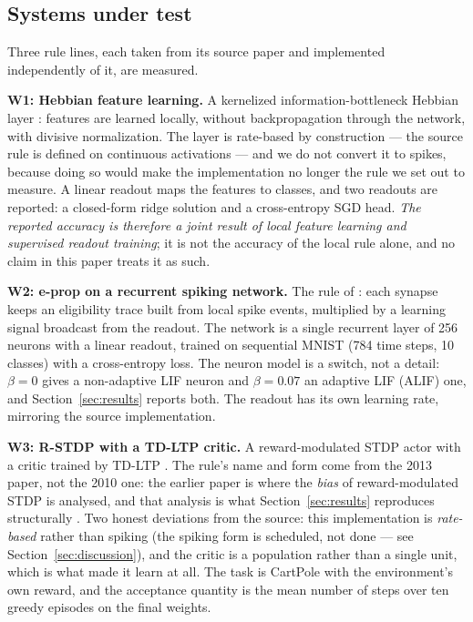 \documentclass[11pt]{article}
\begin{document}
\subsection{Systems under test}
Three rule lines, each taken from its source paper and implemented independently
of it, are measured.

\textbf{W1: Hebbian feature learning.} A kernelized information-bottleneck
Hebbian layer \citep{pogodin2020kernelized}: features are learned locally,
without backpropagation through the network, with divisive normalization. The
layer is rate-based by construction --- the source rule is defined on continuous
activations --- and we do not convert it to spikes, because doing so would make
the implementation no longer the rule we set out to measure. A linear readout
maps the features to classes, and two readouts are reported: a closed-form ridge
solution and a cross-entropy SGD head. \emph{The reported accuracy is therefore a
joint result of local feature learning and supervised readout training}; it is
not the accuracy of the local rule alone, and no claim in this paper treats it
as such.

\textbf{W2: e-prop on a recurrent spiking network.} The rule of
\citet{bellec2020eprop}: each synapse keeps an eligibility trace built from
local spike events, multiplied by a learning signal broadcast from the readout.
The network is a single recurrent layer of 256 neurons with a linear readout,
trained on sequential MNIST (784 time steps, 10 classes) with a cross-entropy
loss. The neuron model is a switch, not a detail: $\beta = 0$ gives a
non-adaptive LIF neuron and $\beta = 0.07$ an adaptive LIF (ALIF) one, and
Section~\ref{sec:results} reports both. The readout has its own learning rate,
mirroring the source implementation.

\textbf{W3: R-STDP with a TD-LTP critic.} A reward-modulated STDP actor with a
critic trained by TD-LTP \citep{fremaux2013}. The rule's name and form come from
the 2013 paper, not the 2010 one: the earlier paper is where the \emph{bias} of
reward-modulated STDP is analysed, and that analysis is what Section~\ref{sec:results}
reproduces structurally \citep{fremaux2010}. Two honest deviations
from the source: this implementation is \emph{rate-based} rather than spiking
(the spiking form is scheduled, not done --- see Section~\ref{sec:discussion}),
and the critic is a population rather than a single unit, which is what made it
learn at all. The task is CartPole with the environment's own reward, and the
acceptance quantity is the mean number of steps over ten greedy episodes on the
final weights.
\end{document}
